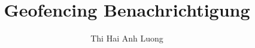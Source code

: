 \documentclass[12pt,a4paper]{article}
\begin{document}
\title{Geofencing Benachrichtigung}
\author{Thi Hai Anh Luong}
\end{document}
